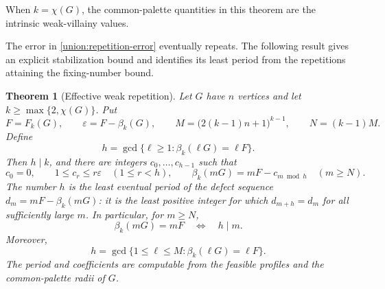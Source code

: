 \documentclass[10pt,a4paper]{amsart}
\numberwithin{equation}{section}
\newtheorem{theorem}{Theorem}[section]
\theoremstyle{definition}
\theoremstyle{remark}
\begin{document}
When $k=\chi(G)$, the common-palette quantities in this theorem
are the intrinsic weak-villainy values.

The error in \cref{union:repetition-error} eventually repeats. The
following result gives an explicit stabilization bound and identifies
its least period from the repetitions attaining the fixing-number bound.

\begin{theorem}[Effective weak repetition]\label{union:repetition-stabilization}
\label{union:repetition-periodic}
Let $G$ have $n$ vertices and let $k\ge\max\{2,\chi(G)\}$.
Put
\[
 F=F_k(G),\qquad \varepsilon=F-\beta_k(G),\qquad
 M=\bigl(2(k-1)n+1\bigr)^{k-1},\qquad N=(k-1)M.
\]
Define
\[
 h=\gcd\{\ell\ge1:\beta_k(\ell G)=\ell F\}.
\]
Then $h\mid k$, and there are integers $c_0,\ldots,c_{h-1}$ such that
\[
 c_0=0,\qquad 1\le c_r\le r\varepsilon\quad(1\le r<h),
 \qquad
 \beta_k(mG)=mF-c_{m\bmod h}\quad(m\ge N).
\]
The number $h$ is the least eventual period of the defect sequence
$d_m=mF-\beta_k(mG)$: it is the least positive integer for which
$d_{m+h}=d_m$ for all sufficiently large $m$. In particular, for $m\ge N$,
\[
 \beta_k(mG)=mF\quad\Longleftrightarrow\quad h\mid m.
\]
Moreover,
\[
 h=\gcd\{1\le\ell\le M:\beta_k(\ell G)=\ell F\}.
\]
The period and coefficients are computable from the feasible profiles
and the common-palette radii of $G$.
\end{theorem}
\end{document}

